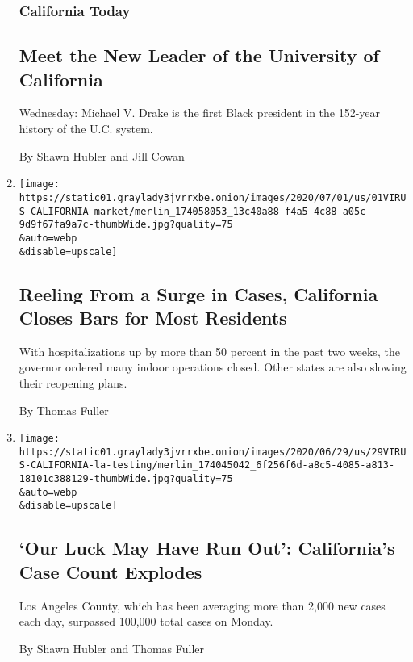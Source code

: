 \begin{enumerate}
  \hypertarget{california-today}{%
  \subsubsection{California Today}\label{california-today}}

  \hypertarget{meet-the-new-leader-of-the-university-of-california}{%
  \subsection{Meet the New Leader of the University of
  California}\label{meet-the-new-leader-of-the-university-of-california}}

  Wednesday: Michael V. Drake is the first Black president in the
  152-year history of the U.C. system.

  By Shawn Hubler and Jill Cowan
\item
  \href{/2020/07/01/us/california-coronavirus-reopening.html}{}

  \texttt{[image: https://static01.graylady3jvrrxbe.onion/images/2020/07/01/us/01VIRUS-CALIFORNIA-market/merlin\_174058053\_13c40a88-f4a5-4c88-a05c-9d9f67fa9a7c-thumbWide.jpg?quality=75\\\&auto=webp\\\&disable=upscale]}

  \hypertarget{reeling-from-a-surge-in-cases-california-closes-bars-for-most-residents}{%
  \subsection{Reeling From a Surge in Cases, California Closes Bars for
  Most
  Residents}\label{reeling-from-a-surge-in-cases-california-closes-bars-for-most-residents}}

  With hospitalizations up by more than 50 percent in the past two
  weeks, the governor ordered many indoor operations closed. Other
  states are also slowing their reopening plans.

  By Thomas Fuller
\item
  \href{/2020/06/29/us/california-coronavirus-reopening.html}{}

  \texttt{[image: https://static01.graylady3jvrrxbe.onion/images/2020/06/29/us/29VIRUS-CALIFORNIA-la-testing/merlin\_174045042\_6f256f6d-a8c5-4085-a813-18101c388129-thumbWide.jpg?quality=75\\\&auto=webp\\\&disable=upscale]}

  \hypertarget{our-luck-may-have-run-out-californias-case-count-explodes}{%
  \subsection{`Our Luck May Have Run Out': California's Case Count
  Explodes}\label{our-luck-may-have-run-out-californias-case-count-explodes}}

  Los Angeles County, which has been averaging more than 2,000 new cases
  each day, surpassed 100,000 total cases on Monday.

  By Shawn Hubler and Thomas Fuller
\end{enumerate}


